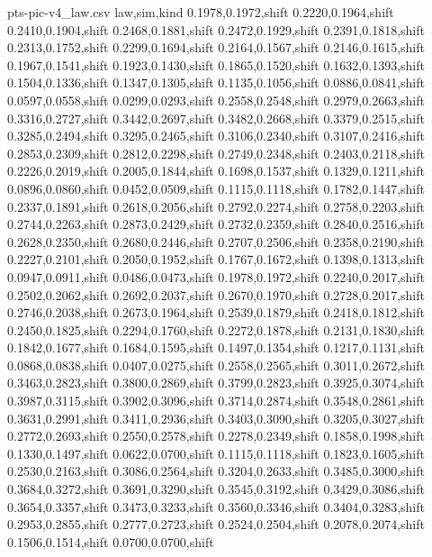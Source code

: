 \begin{filecontents*}[overwrite]{pts-pic-v4_law.csv}
law,sim,kind
0.1978,0.1972,shift
0.2220,0.1964,shift
0.2410,0.1904,shift
0.2468,0.1881,shift
0.2472,0.1929,shift
0.2391,0.1818,shift
0.2313,0.1752,shift
0.2299,0.1694,shift
0.2164,0.1567,shift
0.2146,0.1615,shift
0.1967,0.1541,shift
0.1923,0.1430,shift
0.1865,0.1520,shift
0.1632,0.1393,shift
0.1504,0.1336,shift
0.1347,0.1305,shift
0.1135,0.1056,shift
0.0886,0.0841,shift
0.0597,0.0558,shift
0.0299,0.0293,shift
0.2558,0.2548,shift
0.2979,0.2663,shift
0.3316,0.2727,shift
0.3442,0.2697,shift
0.3482,0.2668,shift
0.3379,0.2515,shift
0.3285,0.2494,shift
0.3295,0.2465,shift
0.3106,0.2340,shift
0.3107,0.2416,shift
0.2853,0.2309,shift
0.2812,0.2298,shift
0.2749,0.2348,shift
0.2403,0.2118,shift
0.2226,0.2019,shift
0.2005,0.1844,shift
0.1698,0.1537,shift
0.1329,0.1211,shift
0.0896,0.0860,shift
0.0452,0.0509,shift
0.1115,0.1118,shift
0.1782,0.1447,shift
0.2337,0.1891,shift
0.2618,0.2056,shift
0.2792,0.2274,shift
0.2758,0.2203,shift
0.2744,0.2263,shift
0.2873,0.2429,shift
0.2732,0.2359,shift
0.2840,0.2516,shift
0.2628,0.2350,shift
0.2680,0.2446,shift
0.2707,0.2506,shift
0.2358,0.2190,shift
0.2227,0.2101,shift
0.2050,0.1952,shift
0.1767,0.1672,shift
0.1398,0.1313,shift
0.0947,0.0911,shift
0.0486,0.0473,shift
0.1978,0.1972,shift
0.2240,0.2017,shift
0.2502,0.2062,shift
0.2692,0.2037,shift
0.2670,0.1970,shift
0.2728,0.2017,shift
0.2746,0.2038,shift
0.2673,0.1964,shift
0.2539,0.1879,shift
0.2418,0.1812,shift
0.2450,0.1825,shift
0.2294,0.1760,shift
0.2272,0.1878,shift
0.2131,0.1830,shift
0.1842,0.1677,shift
0.1684,0.1595,shift
0.1497,0.1354,shift
0.1217,0.1131,shift
0.0868,0.0838,shift
0.0407,0.0275,shift
0.2558,0.2565,shift
0.3011,0.2672,shift
0.3463,0.2823,shift
0.3800,0.2869,shift
0.3799,0.2823,shift
0.3925,0.3074,shift
0.3987,0.3115,shift
0.3902,0.3096,shift
0.3714,0.2874,shift
0.3548,0.2861,shift
0.3631,0.2991,shift
0.3411,0.2936,shift
0.3403,0.3090,shift
0.3205,0.3027,shift
0.2772,0.2693,shift
0.2550,0.2578,shift
0.2278,0.2349,shift
0.1858,0.1998,shift
0.1330,0.1497,shift
0.0622,0.0700,shift
0.1115,0.1118,shift
0.1823,0.1605,shift
0.2530,0.2163,shift
0.3086,0.2564,shift
0.3204,0.2633,shift
0.3485,0.3000,shift
0.3684,0.3272,shift
0.3691,0.3290,shift
0.3545,0.3192,shift
0.3429,0.3086,shift
0.3654,0.3357,shift
0.3473,0.3233,shift
0.3560,0.3346,shift
0.3404,0.3283,shift
0.2953,0.2855,shift
0.2777,0.2723,shift
0.2524,0.2504,shift
0.2078,0.2074,shift
0.1506,0.1514,shift
0.0700,0.0700,shift
\end{filecontents*}
